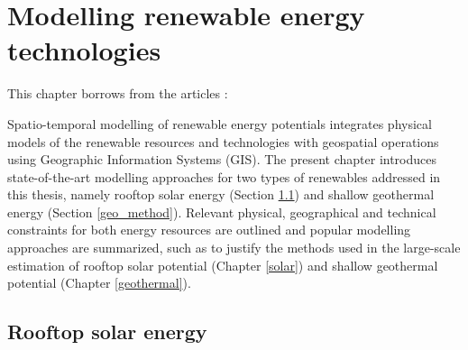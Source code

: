 
\chapter{Modelling renewable energy technologies}
\label{methods_physical}

\vspace{-15pt} %
\begin{tcolorbox}[enhanced,width=\textwidth,size=fbox,
        sharp corners,colframe=black!5!white,drop fuzzy shadow southeast,
        boxrule=3mm, parbox=false] 
        
This chapter borrows from the articles \citep{walch_big_2020,walch_quantifying_2021}:

\qquad {}

\qquad {}
\end{tcolorbox}

Spatio-temporal modelling of renewable energy potentials integrates physical models of the renewable resources and technologies with geospatial operations using Geographic Information Systems (GIS).
The present chapter introduces state-of-the-art modelling approaches for two types of renewables addressed in this thesis, namely rooftop solar energy (Section \ref{method_solar}) and shallow geothermal energy (Section \ref{geo_method}). 
Relevant physical, geographical and technical constraints for both energy resources are outlined and popular modelling approaches are summarized, such as to justify the methods used in the large-scale estimation of rooftop solar potential (Chapter \ref{solar}) and shallow geothermal potential (Chapter \ref{geothermal}).

\section{Rooftop solar energy}
\label{method_solar}


